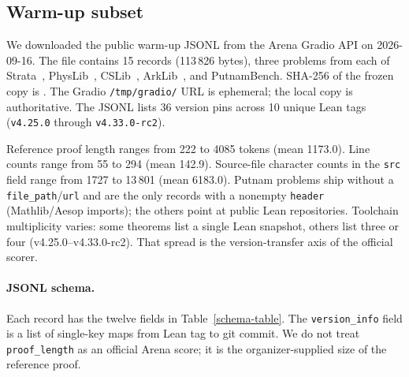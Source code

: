 \documentclass{article}
\begin{document}
\subsection{Warm-up subset}
\label{warmup}

We downloaded the public warm-up JSONL from the Arena Gradio API on 2026-09-16. The file contains 15 records (113\,826 bytes), three problems from each of Strata~\cite{strata}, PhysLib~\cite{physlib}, CSLib~\cite{cslib}, ArkLib~\cite{arklib}, and PutnamBench. SHA-256 of the frozen copy is . The Gradio \texttt{/tmp/gradio/} URL is ephemeral; the local copy is authoritative. The JSONL lists 36 version pins across 10 unique Lean tags (\texttt{v4.25.0} through \texttt{v4.33.0-rc2}).

\begin{table}[ht]
  \caption{Public warm-up subset (15 problems). Proof tokens are the JSONL \texttt{proof\_length} field. Short names are last-component labels; full identifiers are in the appendix. No refactoring scores are reported.}
  \label{warmup-table}
  \centering
  \small
  
\end{table}

Reference proof length ranges from 222 to 4085 tokens (mean 1173.0). Line counts range from 55 to 294 (mean 142.9). Source-file character counts in the \texttt{src} field range from 1727 to 13\,801 (mean 6183.0). Putnam problems ship without a \texttt{file\_path}/\texttt{url} and are the only records with a nonempty \texttt{header} (Mathlib/Aesop imports); the others point at public Lean repositories. Toolchain multiplicity varies: some theorems list a single Lean snapshot, others list three or four (v4.25.0--v4.33.0-rc2). That spread is the version-transfer axis of the official scorer.

\paragraph{JSONL schema.} Each record has the twelve fields in Table~\ref{schema-table}. The \texttt{version\_info} field is a list of single-key maps from Lean tag to git commit. We do not treat \texttt{proof\_length} as an official Arena score; it is the organizer-supplied size of the reference proof.
\end{document}
